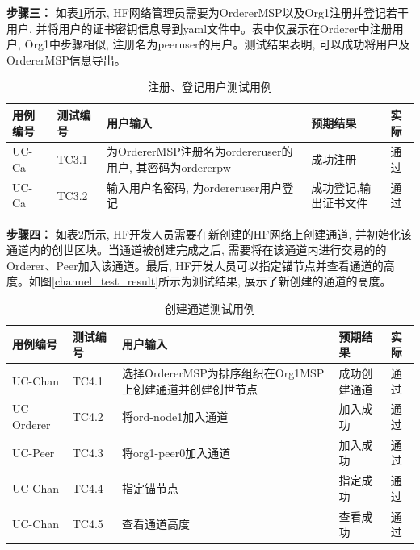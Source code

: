\textbf{步骤三：} 如表\ref{reg_enroll_test}所示, HF网络管理员需要为OrdererMSP以及Org1注册并登记若干用户, 并将用户的证书密钥信息导到yaml文件中。表中仅展示在Orderer中注册用户, Org1中步骤相似, 注册名为peeruser的用户。测试结果表明, 可以成功将用户及OrdererMSP信息导出。

\newpage

{\footnotesize
\begin{longtable}[h]{m{45pt} m{45pt} m{180pt} m{50pt} m{20pt}}
    \caption[注册、登记用户测试用例]{注册、登记用户测试用例} \label{reg_enroll_test}\\
        \hline  
        用例编号&测试编号&用户输入&预期结果&实际\\
        \hline
        UC-Ca & TC3.1 & 为OrdererMSP注册名为ordereruser的用户, 其密码为ordererpw & 成功注册 & 通过 \\
        \hline
        UC-Ca & TC3.2 & 输入用户名密码, 为ordereruser用户登记 & 成功登记,输出证书文件 & 通过 \\
        \hline
    \end{longtable} 
}

\textbf{步骤四：} 如表\ref{channel_test}所示, HF开发人员需要在新创建的HF网络上创建通道, 并初始化该通道内的创世区块。当通道被创建完成之后, 需要将在该通道内进行交易的的Orderer、Peer加入该通道。最后, HF开发人员可以指定锚节点并查看通道的高度。如图\ref{channel_test_result}所示为测试结果, 展示了新创建的通道的高度。

{\footnotesize
\begin{longtable}[h]{m{45pt} m{45pt} m{180pt} m{50pt} m{20pt}}
    \caption[创建通道测试用例]{创建通道测试用例} \label{channel_test}\\
        \hline  
        用例编号&测试编号&用户输入&预期结果&实际\\
        \hline
        UC-Chan & TC4.1 & 选择OrdererMSP为排序组织在Org1MSP上创建通道并创建创世节点 & 成功创建通道 & 通过 \\
        \hline
        UC-Orderer & TC4.2 & 将ord-node1加入通道 & 加入成功 & 通过 \\
        \hline
        UC-Peer & TC4.3 & 将org1-peer0加入通道 & 加入成功 & 通过 \\
        \hline
        UC-Chan & TC4.4 & 指定锚节点 & 指定成功 & 通过 \\
        \hline
        UC-Chan & TC4.5 & 查看通道高度 & 查看成功 & 通过 \\
        \hline
    \end{longtable} 
}

